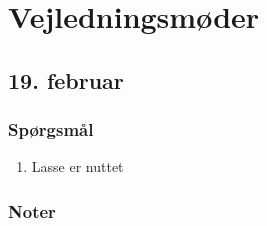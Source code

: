 \chapter{Vejledningsmøder}

\section{19. februar}


\subsection{Spørgsmål}
\begin{enumerate}
    \item Lasse er nuttet 
\end{enumerate}

\subsection{Noter}